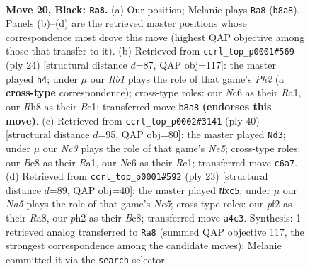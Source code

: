 \documentclass[11pt]{article}
\begin{document}
\clearpage

\begin{figure}[p]\centering
\begin{subfigure}{0.46\textwidth}\centering
\resizebox{\linewidth}{!}{%
\newchessgame
\chessboard[
  setfen={1rb2b1r/5k1p/ppn1p1p1/4Pp2/n1B2B2/1N3NP1/PP3P1P/R1K3R1 b - - 1 20},
  showmover=false,
  pgfstyle=straightmove, color=movearrow, markmove={b8-a8}
]}
\caption{}
\end{subfigure}\hfill
\begin{subfigure}{0.46\textwidth}\centering
\resizebox{\linewidth}{!}{%
\newchessgame
\chessboard[
  setfen={r3k2r/ppp2ppp/2n2nb1/6N1/4p1P1/P1P5/3PPPBP/R1B1K2R w KQkq - 1 13},
  showmover=false,
  pgfstyle=straightmove, color=movearrow, markmove={h2-h4}
]}
\caption{}
\end{subfigure}
\\[4pt]
\begin{subfigure}{0.46\textwidth}\centering
\resizebox{\linewidth}{!}{%
\newchessgame
\chessboard[
  setfen={r3k2r/1p2b1pp/2p1pn2/3bNp2/p2P4/5PP1/PP2P1BP/R1R1B1K1 w kq - 1 21},
  showmover=false,
  pgfstyle=straightmove, color=movearrow, markmove={e5-d3}
]}
\caption{}
\end{subfigure}\hfill
\begin{subfigure}{0.46\textwidth}\centering
\resizebox{\linewidth}{!}{%
\newchessgame
\chessboard[
  setfen={r1br2k1/pp2ppbp/2n3p1/2P5/2B1n3/1PN1PN2/PB2KPPP/2R4R b - - 2 12},
  showmover=false,
  pgfstyle=straightmove, color=movearrow, markmove={e4-c5}
]}
\caption{}
\end{subfigure}
\caption{\textbf{Move 20, Black: \texttt{Ra8}.} (a) Our position; Melanie plays \texttt{Ra8} (\texttt{b8a8}). Panels (b)--(d) are the retrieved master positions whose correspondence most drove this move (highest QAP objective among those that transfer to it). (b) Retrieved from \texttt{ccrl\_top\_p0001\#569} (ply 24) [structural distance $d$=87, QAP obj=117]: the master played \texttt{h4}; under $\mu$ our \emph{Rb1} plays the role of that game's \emph{Ph2} (a \textbf{cross-type} correspondence); cross-type roles: our \emph{N}c6 as their \emph{R}a1, our \emph{R}h8 as their \emph{B}c1; transferred move \texttt{b8a8} \textbf{(endorses this move)}. (c) Retrieved from \texttt{ccrl\_top\_p0002\#3141} (ply 40) [structural distance $d$=95, QAP obj=80]: the master played \texttt{Nd3}; under $\mu$ our \emph{Nc3} plays the role of that game's \emph{Ne5}; cross-type roles: our \emph{B}c8 as their \emph{R}a1, our \emph{N}c6 as their \emph{R}c1; transferred move \texttt{c6a7}. (d) Retrieved from \texttt{ccrl\_top\_p0001\#592} (ply 23) [structural distance $d$=89, QAP obj=40]: the master played \texttt{Nxc5}; under $\mu$ our \emph{Na5} plays the role of that game's \emph{Ne5}; cross-type roles: our \emph{p}f2 as their \emph{R}a8, our \emph{p}h2 as their \emph{B}c8; transferred move \texttt{a4c3}. Synthesis: 1 retrieved analog transferred to \texttt{Ra8} (summed QAP objective 117, the strongest correspondence among the candidate moves); Melanie committed it via the \texttt{search} selector.}
\label{fig:thought-m39}
\end{figure}
\end{document}
